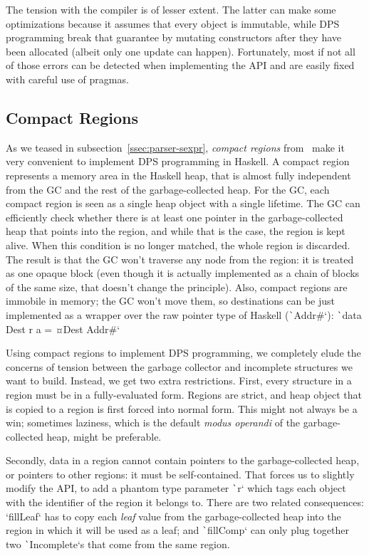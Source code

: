 \documentclass[english]{jflart}
\begin{document}
The tension with the compiler is of lesser extent. The latter can make some optimizations because it assumes that every object is immutable, while DPS programming break that guarantee by mutating constructors after they have been allocated (albeit only one update can happen). Fortunately, most if not all of those errors can be detected when implementing the API and are easily fixed with careful use of pragmas.

\subsection{Compact Regions}\label{ssec:impl-compact-regions}

As we teased in subsection~\ref{ssec:parser-sexpr}, \emph{compact regions} from~\cite{yang_efficient_2015} make it very convenient to implement DPS programming in 
Haskell. A compact region represents a memory area in the Haskell heap, that is almost fully independent from the GC and the rest of the garbage-collected heap. For the GC, each compact region is seen as a single heap object with a single lifetime. The GC can efficiently check whether there is at least one pointer in the garbage-collected heap that points into the region, and while that is the case, the region is kept alive. When this condition is no longer matched, the whole region is discarded. The result is that the GC won't traverse any node from the region: it is treated as one opaque block (even though it is actually implemented as a chain of blocks of the same size, that doesn't change the principle). Also, compact regions are immobile in memory; the GC won't move them, so destinations can be just implemented as a wrapper over the raw pointer type of Haskell (\texttt`Addr#`): \texttt`data Dest r a = ¤Dest Addr#`

Using compact regions to implement DPS programming, we completely elude the concerns of tension between the garbage collector and incomplete structures we want to build. Instead, we get two extra restrictions. First, every structure in a region must be in a fully-evaluated form. Regions are strict, and heap object that is copied to a region is first forced into normal form. This might not always be a win; sometimes laziness, which is the default \emph{modus operandi} of the garbage-collected heap, might be preferable.

Secondly, data in a region cannot contain pointers to the garbage-collected heap, or pointers to other regions: it must be self-contained. That forces us to slightly modify the API, to add a phantom type parameter \texttt`r` which tags each object with the identifier of the region it belongs to. There are two related consequences: `fillLeaf` has to copy each \emph{leaf} value from the garbage-collected heap into the region in which it will be used as a leaf; and \texttt`fillComp` can only plug together two \texttt`Incomplete`s that come from the same region.
\end{document}
